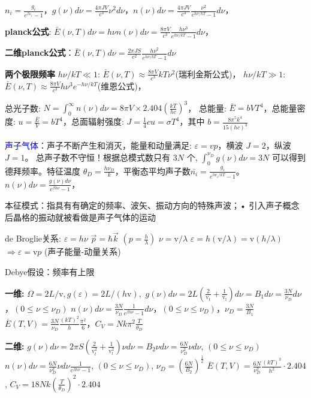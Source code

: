 \documentclass[a4paper,8pt]{extarticle} %
\newcommand{\bluetext}[1]{\textcolor{blue}{#1}}
\begin{document}
\begin{multicols}{3}
$n_i = \frac{g_i}{e^{\beta\varepsilon_i}-1}$，$g(\nu)d\nu = \frac{4\pi JV}{c^3}\nu^2d\nu$，$n(\nu)d\nu = \frac{4\pi JV}{c^3}\frac{\nu^2}{e^{h\nu/kT}-1}d\nu$，

\textbf{planck公式}: $\bar{E}(\nu,T)d\nu = h\nu n(\nu)d\nu = \frac{8\pi V}{c^3}\frac{h\nu^3}{e^{h\nu/kT}-1}d\nu$，

\textbf{二维planck公式}：$\bar{E}(\nu,T)d\nu = \frac{2\pi JS}{c^2}\frac{h\nu^2}{e^{h\nu/kT}-1}d\nu$

\textbf{两个极限频率}
$h\nu/kT \ll 1$: $\bar{E}(\nu,T) \approx \frac{8\pi V}{c^3}kT\nu^2$(瑞利金斯公式)，
$h\nu/kT \gg 1$: $\bar{E}(\nu,T) \approx \frac{8\pi V}{c^3}h\nu^3e^{-h\nu/kT}$(维恩公式)，

总光子数: $N=\int_0^{\infty}n(\nu)d\nu=8\pi V \times 2.404\left(\frac{kT}{hc}\right)^3$，
总能量: $\bar{E} = bVT^4$，总能量密度: $u = \frac{\bar{E}}{V} = bT^4$，总面辐射强度: $J = \frac{1}{4}cu = \sigma T^4$，其中 $b = \frac{8\pi^5k^4}{15(hc)^3}$


\bluetext{声子气体}：声子不断产生和消灭，能量和动量满足: $\varepsilon = vp$，横波 $J = 2$，纵波 $J = 1$。
总声子数不守恒！根据总模式数只有 $3N$ 个, $\int_0^{\nu_D} g(\nu)d\nu = 3N$ 可以得到德拜频率。特征温度 $\theta_D = \frac{h\nu_D}{k}$，平衡态平均声子数$\bar{n_i} = \frac{g_i}{e^{h\nu_i/kT}-1}$。$n(\nu)d\nu = \frac{g(\nu)d\nu}{e^{\beta h\nu}-1}$，

本征模式：指具有有确定的频率、波矢、振动方向的特殊声波；• 引入声子概念后晶格的振动就被看做是声子气体的运动

de Broglie关系:
$\varepsilon = h\nu$
$\vec{p} = \hbar\vec{k}$ $(p = \frac{h}{\lambda})$
$\nu = \mathrm{v}/\lambda$
$\varepsilon = h(\mathrm{v}/\lambda) = \mathrm{v}(h/\lambda)$
$\Rightarrow \varepsilon = \mathrm{v}p$ (声子能量-动量关系)

Debye假设：频率有上限

\textbf{一维:}
$\Omega=2L/\mathrm{v},g(\varepsilon)=2L/(h\mathrm{v}),$
$g(\nu)d\nu = 2L(\frac{2}{\mathrm{v_t}} + \frac{1}{\mathrm{v_l}})d\nu = B_1d\nu = \frac{3N}{\nu_D}d\nu$，$(0 \leq \nu \leq \nu_D)$
$n(\nu)d\nu = \frac{3N}{\nu_D}\frac{1}{e^{\beta h\nu}-1}d\nu$，$(0 \leq \nu \leq \nu_D)$，$\nu_D = \frac{3N}{B_1}$
$\overline{E}(T,V) = \frac{3N}{\nu_D}\frac{(kT)^2}{h}\frac{\pi^2}{6}$，$C_V = Nk\pi^2\frac{T}{\theta_D}$

\textbf{二维:}
$g(\nu)d\nu = 2\pi S(\frac{2}{\mathrm{v}_t^2} + \frac{1}{\mathrm{v}_l^2})\nu d\nu = B_2\nu d\nu = \frac{6N}{\nu_D^2}\nu d\nu$, $(0 \leq \nu \leq \nu_D)$
$n(\nu)d\nu = \frac{6N}{\nu_D^2}\nu d\nu\frac{1}{e^{\beta h\nu}-1}$, $(0 \leq \nu \leq \nu_D)$, $\nu_D = (\frac{6N}{B_2})^{\frac{1}{2}}$
$\overline{E}(T,V) = \frac{6N}{\nu_D^2}\frac{(kT)^3}{h^2}\cdot2.404$, $C_V = 18Nk(\frac{T}{\theta_D})^2\cdot2.404$


\end{multicols}
\end{document}
